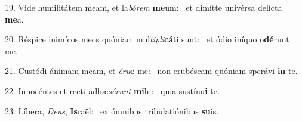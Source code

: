 19. Vide humilitátem meam, et la\textit{bó}\textit{rem} \textbf{me}um: \ast\  et dimítte univérsa delícta \textbf{me}a.\

20. Réspice inimícos meos quóniam mul\textit{ti}\textit{pli}\textbf{cá}ti sunt: \ast\  et ódio iníquo o\textbf{dé}runt me.\

21. Custódi ánimam meam, et \textit{é}\textit{ru}\textbf{e} me: \ast\  non erubéscam quóniam sperávi \textbf{in} te.\

22. Innocéntes et recti adhæ\textit{sé}\textit{runt} \textbf{mi}hi: \ast\  quia sustínu\textbf{i} te.\

23. Líbera, \textit{De}\textit{us}, \textbf{Is}raël: \ast\  ex ómnibus tribulatiónibus \textbf{su}is.\

